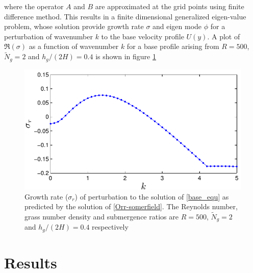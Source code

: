 \documentclass[12pt]{report}   %
\newcommand{\Ndg}{\tilde{N}_g}
\begin{document}
where the operator $A$ and $B$ are approximated at the grid points using finite difference method. This results in a finite dimensional generalized eigen-value problem, whose solution provide growth rate $\sigma$ and eigen mode $\phi$ for a perturbation of wavenumber $k$ to the base velocity profile $U(y)$. A plot of $\Re(\sigma)$ as a function of wavenumber $k$ for a base profile arising from $R=500$, $\Ndg=2$ and $h_g/(2H)=0.4$ is shown in figure \ref{GrowthRateVsK} 

\begin{figure}
 \centerline{\includegraphics{GrowthrateVsK}}
 \caption{Growth rate ($\sigma_r$) of perturbation to the solution of \eqref{base_equ} as predicted by the solution of \eqref{Orr-somerfield}. The  Reynolds number, grass number density and submergence ratios are $R=500$, $\Ndg=2$ and $h_{g}/(2H) = 0.4$ respectively }
 \label{GrowthRateVsK}
\end{figure}


%
\clearpage{\pagestyle{empty}\cleardoublepage}

\section{Results}
\end{document}
